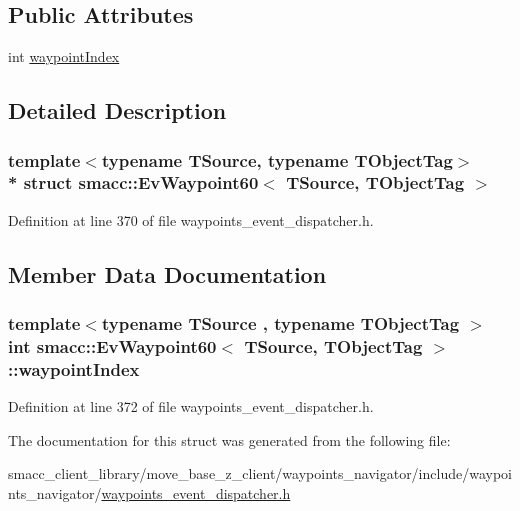 \subsection*{Public Attributes}
\begin{DoxyCompactItemize}
\item 
int \hyperlink{structsmacc_1_1EvWaypoint60_a7f5a625c595998aaefc5bcd293a8abc6}{waypoint\+Index}
\end{DoxyCompactItemize}


\subsection{Detailed Description}
\subsubsection*{template$<$typename T\+Source, typename T\+Object\+Tag$>$\\*
struct smacc\+::\+Ev\+Waypoint60$<$ T\+Source, T\+Object\+Tag $>$}



Definition at line 370 of file waypoints\+\_\+event\+\_\+dispatcher.\+h.



\subsection{Member Data Documentation}
\subsubsection[{\texorpdfstring{waypoint\+Index}{waypointIndex}}]{\setlength{\rightskip}{0pt plus 5cm}template$<$typename T\+Source , typename T\+Object\+Tag $>$ int {\bf smacc\+::\+Ev\+Waypoint60}$<$ T\+Source, T\+Object\+Tag $>$\+::waypoint\+Index}\hypertarget{structsmacc_1_1EvWaypoint60_a7f5a625c595998aaefc5bcd293a8abc6}{}\label{structsmacc_1_1EvWaypoint60_a7f5a625c595998aaefc5bcd293a8abc6}


Definition at line 372 of file waypoints\+\_\+event\+\_\+dispatcher.\+h.



The documentation for this struct was generated from the following file\+:\begin{DoxyCompactItemize}
\item 
smacc\+\_\+client\+\_\+library/move\+\_\+base\+\_\+z\+\_\+client/waypoints\+\_\+navigator/include/waypoints\+\_\+navigator/\hyperlink{waypoints__event__dispatcher_8h}{waypoints\+\_\+event\+\_\+dispatcher.\+h}\end{DoxyCompactItemize}
